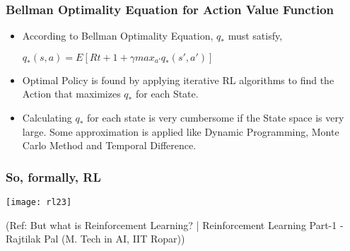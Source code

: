 \begin{frame}[fragile]\frametitle{Bellman Optimality Equation for Action Value Function}

\begin{itemize}
\item According to Bellman Optimality Equation, $q_{*}$ must satisfy,

$q_{*}(s,a) = E[R{t+1} + \gamma max_{a'} q_{*}(s',a')]$

\item Optimal Policy is found by applying iterative RL algorithms to find the Action that maximizes $q_*$ for each State.

\item Calculating $q_*$ for each state is very cumbersome if the State space is very large. Some approximation is applied like Dynamic Programming, Monte Carlo Method and Temporal Difference.
\end{itemize}

\end{frame}

\begin{frame}[fragile]\frametitle{So, formally, RL}

\begin{center}
\texttt{[image: rl23]}
\end{center}

{\tiny (Ref: But what is Reinforcement Learning? | Reinforcement Learning Part-1 - Rajtilak Pal (M. Tech in AI, IIT Ropar))}
\end{frame}

